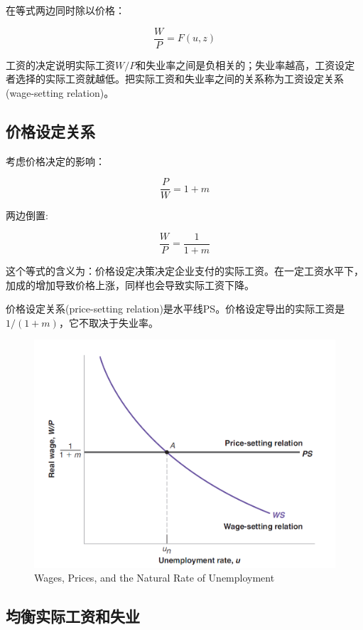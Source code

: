 \documentclass{article}
\begin{document}
在等式两边同时除以价格：

\[
\frac{W}{P}=F(u,z)
\]

工资的决定说明实际工资$ W/P $和失业率之间是负相关的；失业率越高，工资设定者选择的实际工资就越低。把实际工资和失业率之间的关系称为工资设定关系(wage-setting relation)。

\subsection{价格设定关系}

考虑价格决定的影响：

\[
\frac{P}{W}=1+m
\]

两边倒置:

\[
\frac{W}{P}=\frac{1}{1+m}
\]

这个等式的含义为：价格设定决策决定企业支付的实际工资。在一定工资水平下，加成的增加导致价格上涨，同样也会导致实际工资下降。

价格设定关系(price-setting relation)是水平线PS。价格设定导出的实际工资是$ 1/(1+m) $，它不取决于失业率。

\begin{figure}[H] %
	\centering %
	\includegraphics[width=1\textwidth]{7_2} %
	\caption{Wages, Prices, and
		the Natural Rate of
		Unemployment} %
	\label{Fig.main3} %
\end{figure}

\subsection{均衡实际工资和失业}
\end{document}
